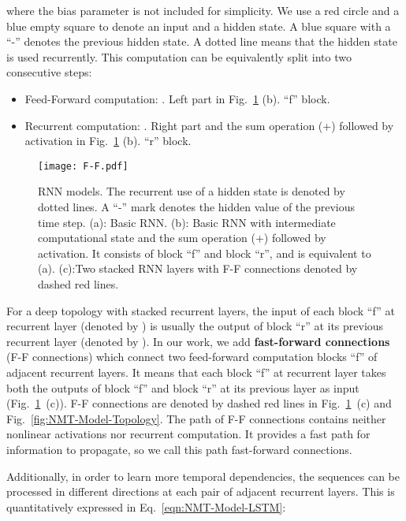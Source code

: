 \documentclass[11pt,letterpaper]{article}
\begin{document}
where the bias parameter is not included for simplicity. We use a red circle and a blue empty square to denote an input and a hidden
state. A blue square with a ``-'' denotes the previous hidden state. A dotted line means that the
hidden state is used recurrently.
This computation can be equivalently split into two consecutive steps:
\begin{itemize}
\item Feed-Forward computation: . Left part in Fig.~\ref{fig:NMT-Model-RNN-FF} (b). ``f'' block.
  \item Recurrent computation: . Right part and the sum operation (+) followed by activation in
      Fig.~\ref{fig:NMT-Model-RNN-FF} (b). ``r'' block.
\end{itemize}
\begin{figure}[!ht]
  \begin{center}
\texttt{[image: F-F.pdf]}
  \caption{RNN models. The recurrent use of a hidden state is denoted by dotted lines. A ``-'' mark denotes the hidden value
  of the previous time step. (a): Basic RNN. (b): Basic RNN with intermediate computational state and the sum operation (+) followed
  by activation. It consists of block ``f'' and block ``r'',  and is equivalent to (a).  (c):Two stacked RNN layers with F-F connections
  denoted by dashed red lines.}
  \label{fig:NMT-Model-RNN-FF}
\end{center}
\end{figure}


For a deep topology with stacked recurrent layers, the input of each block ``f'' at recurrent layer  (denoted by ) is usually the
output of block ``r'' at its previous recurrent layer  (\mbox{denoted} by ). In our work, we add \textbf{fast-forward
connections} (F-F connections) which connect two feed-forward computation blocks ``f'' of adjacent recurrent layers. It means that each block
``f'' at recurrent layer  takes both the outputs of block ``f'' and block ``r'' at its previous layer as input
(Fig.~\ref{fig:NMT-Model-RNN-FF}~(c)). F-F connections are denoted by dashed red lines in Fig.~\ref{fig:NMT-Model-RNN-FF}~(c) and
Fig.~\ref{fig:NMT-Model-Topology}. The path of F-F connections contains neither nonlinear activations nor recurrent computation. It provides a
fast path for information to propagate, so we call this path fast-forward connections.


Additionally, in order to learn more temporal dependencies, the sequences can be processed in \mbox{different} directions at each pair of
adjacent recurrent layers. This is quantitatively expressed in Eq.~\ref{eqn:NMT-Model-LSTM}:
\end{document}
